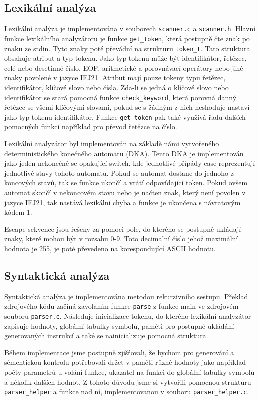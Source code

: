 \documentclass[11pt]{article}
\begin{document}
\subsection{Lexikální analýza}
Lexikální analýza je implementována v souborech \texttt{scanner.c} a \texttt{scanner.h}. Hlavní funkce lexikálního analyzátoru je funkce \texttt{get\_token},
která postupně čte znak po znaku ze stdin. Tyto znaky poté převádní na strukturu \texttt{token\_t}. Tato struktura obsahuje atribut a typ tokenu.
Jako typ tokenu může být identifikátor, řetězec, celé nebo desetinné číslo, EOF, aritmetické a porovnávací operátory nebo jiné znaky povolené v jazyce IFJ21.
Atribut mají pouze tokeny typu řetězec, identifikátor, klíčové slovo nebo čísla. Zda-li se jedná o klíčové slovo nebo identifikátor
se stará pomocná funkce \texttt{check\_keyword}, která porovná danný řetězec se všemi klíčovými slovami, pokud se s žádným z nich neshoduje nastaví jako typ
tokenu identifikátor. Funkce \texttt{get\_token} pak také využívá řadu dalších pomocných funkcí například pro převod řetězce na číslo.

Lexikální analyzátor byl implementován na základě námi vytvořeného deterministického konečného automatu (DKA).
Tento DKA je implementován jako jeden nekonečně se opakující switch, kde jednotlivé přípády case reprezentují jednotlivé stavy tohoto automatu.
Pokud se automat dostane do jednoho z koncových stavů, tak se funkce ukončí a vrátí odpovídající token. Pokud ovšem
automat skončí v nekoncovém stavu nebo je načten znak, který není povolen v jazyce IFJ21, tak nastává lexikální chyba a funkce je ukončena s návratovým kódem 1.

Escape sekvence jsou řešeny za pomoci pole, do kterého se postupně ukládají znaky, které mohou být v rozsahu 0-9. Toto decimalní číslo jehož maximální
hodnota je 255, je poté převedeno na korespondující ASCII hodnotu.

\subsection{Syntaktická analýza}
Syntaktická analýza je implementována metodou rekurzivního sestupu. Překlad zdrojového kódu začíná zavolaním funkce
\texttt{parse} z funkce main ve zdrojovém souboru \texttt{parser.c}. Následuje inicializace tokenu, do kterého lexikální analyzátor
zapisuje hodnoty, globální tabulky symbolů, paměti pro postupné ukládání generovaných instrukcí a také se nainicializuje pomocná struktura.

Během implementace jsme postupně zjišťovali,
že bychom pro generování a sémentickou kontrolu potřebovali držet v paměti různé hodnoty jako například počty parametrů u volání funkce,
 ukazatel na funkci do globální tabulky symbolů a několik dalších hodnot. Z tohoto důvodu jsme si vytvořili pomocnou strukturu
 \texttt{parser\_helper} a funkce nad ní, implementovanou v souboru \texttt{parser\_helper.c}.
\end{document}
